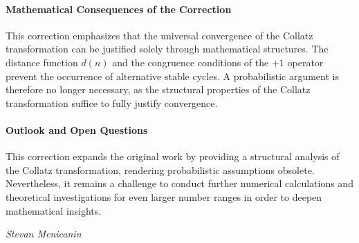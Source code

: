 \documentclass[a4paper,12pt]{article}
\begin{document}
\paragraph{Mathematical Consequences of the Correction}  
This correction emphasizes that the universal convergence of the Collatz transformation can be justified solely through mathematical structures. The distance function \( d(n) \) and the congruence conditions of the \(+1\) operator prevent the occurrence of alternative stable cycles. A probabilistic argument is therefore no longer necessary, as the structural properties of the Collatz transformation suffice to fully justify convergence.

\paragraph{Outlook and Open Questions}  
This correction expands the original work by providing a structural analysis of the Collatz transformation, rendering probabilistic assumptions obsolete. Nevertheless, it remains a challenge to conduct further numerical calculations and theoretical investigations for even larger number ranges in order to deepen mathematical insights.




\vspace{1cm}
\begin{flushright}
\textit{Stevan Menicanin}
\end{flushright}




\newpage
\pagestyle{empty}  %
\clearpage
\end{document}
